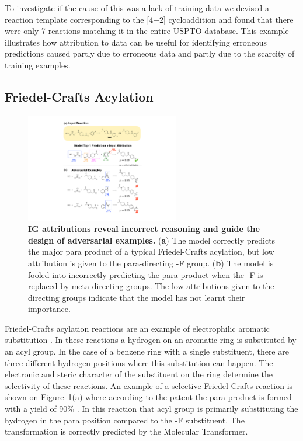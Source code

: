 To investigate if the cause of this was a lack of training data we devised a reaction template corresponding to the [4+2] cycloaddition and found that there were only 7 reactions matching it in the entire USPTO database. This example illustrates how attribution to data can be useful for identifying erroneous predictions caused partly due to erroneous data and partly due to the scarcity of training examples. 

\subsection{Friedel-Crafts Acylation}

\begin{figure}[ht!]
    \centering
    \includegraphics[width=0.6\textwidth]{Chapters/Transformer/Figs/sear.pdf}
    \caption{\label{fig:sear} \textbf{IG attributions reveal incorrect reasoning and guide the design of adversarial examples.} (\textbf{a}) The model correctly predicts the major para product of a typical Friedel-Crafts acylation, but low attribution is given to the para-directing -F group. (\textbf{b}) The model is fooled into incorrectly predicting the para product when the -F is replaced by meta-directing groups. The low attributions given to the directing groups indicate that the model has not learnt their importance.}
\end{figure}

Friedel-Crafts acylation reactions are an example of electrophilic aromatic substitution \cite{Friedel1877}. In these reactions a hydrogen on an aromatic ring is substituted by an acyl group. In the case of a benzene ring with a single substituent, there are three different hydrogen positions where this substitution can happen. The electronic and steric character of the substituent on the ring determine the selectivity of these reactions. An example of a selective Friedel-Crafts reaction is shown on Figure~\ref{fig:sear}(a) where according to the patent the para product is formed with a yield of 90\% \cite{fc_para1981}. In this reaction that acyl group is primarily substituting the hydrogen in the para position compared to the -F substituent. The transformation is correctly predicted by the Molecular Transformer. 

